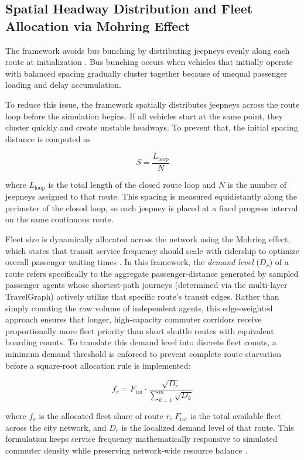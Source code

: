 {{\subsection{Spatial Headway Distribution and Fleet Allocation via Mohring Effect}
\noindent
The framework avoids bus bunching by distributing jeepneys evenly along each route at initialization \citep{yang2020}. Bus bunching occurs when vehicles that initially operate with balanced spacing gradually cluster together because of unequal passenger loading and delay accumulation.

To reduce this issue, the framework spatially distributes jeepneys across the route loop before the simulation begins. If all vehicles start at the same point, they cluster quickly and create unstable headways. To prevent that, the initial spacing distance is computed as

\[
S = \frac{L_{\text{loop}}}{N}
\]

where $L_{\text{loop}}$ is the total length of the closed route loop and $N$ is the number of jeepneys assigned to that route. This spacing is measured equidistantly along the perimeter of the closed loop, so each jeepney is placed at a fixed progress interval on the same continuous route. \citep{mohring1972}

Fleet size is dynamically allocated across the network using the Mohring effect, which states that transit service frequency should scale with ridership to optimize overall passenger waiting times \citep{mohring1972}. In this framework, the \textit{demand level} ($D_r$) of a route refers specifically to the aggregate passenger-distance generated by sampled passenger agents whose shortest-path journeys (determined via the multi-layer TravelGraph) actively utilize that specific route's transit edges. Rather than simply counting the raw volume of independent agents, this edge-weighted approach ensures that longer, high-capacity commuter corridors receive proportionally more fleet priority than short shuttle routes with equivalent boarding counts. To translate this demand level into discrete fleet counts, a minimum demand threshold is enforced to prevent complete route starvation before a square-root allocation rule is implemented:

\[
f_r = F_{\text{tot}} \cdot \frac{\sqrt{D_r}}{\sum_{k=1}^{m}\sqrt{D_k}}
\]

where $f_r$ is the allocated fleet share of route $r$, $F_{\text{tot}}$ is the total available fleet across the city network, and $D_r$ is the localized demand level of that route. This formulation keeps service frequency mathematically responsive to simulated commuter density while preserving network-wide resource balance \citep{mohring1972}.

}}
